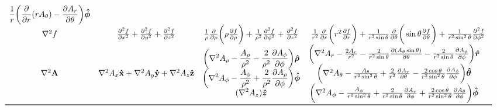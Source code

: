 \documentclass[a4paper]{article}
\begin{document}
\begin{sidewaystable}
\[\begin{array}{cccc}
\begin{matrix}
    \displaystyle{1 \over r}\bigg ({\partial \over \partial r} ( r A_\theta )
    - {\partial A_r \over \partial \theta} \bigg) \boldsymbol{\hat \phi}
\end{matrix}
\\
\nabla^2 f &
{\partial^2 f \over \partial x^2} + {\partial^2 f \over \partial y^2} + {\partial^2 f \over \partial z^2}
&{1 \over \rho}{\partial \over \partial \rho} \bigg (\rho {\partial f \over \partial \rho} \bigg )
+ {1 \over \rho^2}{\partial^2 f \over \partial \phi^2}
+ {\partial^2 f \over \partial z^2}
&{1 \over r^2}{\partial \over \partial r} \bigg (r^2 {\partial f \over \partial r} \bigg)
+ {1 \over r^2\sin\theta}{\partial \over \partial \theta} \bigg(\sin\theta {\partial f \over \partial \theta} \bigg)
+ {1 \over r^2\sin^2\theta}{\partial^2 f \over \partial \phi^2}\\
\nabla^2 \mathbf{A} & \nabla^2 A_x \mathbf{\hat x} + \nabla^2 A_y \mathbf{\hat y} + \nabla^2 A_z \mathbf{\hat z} & 
\begin{matrix}
    \displaystyle \bigg (\nabla^2 A_\rho - {A_\rho \over \rho^2}
    - {2 \over \rho^2}{\partial A_\phi \over \partial \phi} \bigg) \boldsymbol{\hat\rho}\\
    \displaystyle \bigg (\nabla^2 A_\phi - {A_\phi \over \rho^2}
    + {2 \over \rho^2}{\partial A_\rho \over \partial \phi} \bigg ) \boldsymbol{\hat\phi}\\
    \displaystyle (\nabla^2 A_z ) \boldsymbol{\hat z}
\end{matrix} & 
\begin{matrix}
    \bigg (\nabla^2 A_r - {2 A_r \over r^2}
    - {2 \over r^2\sin\theta}{\partial (A_\theta \sin\theta) \over \partial\theta}
    - {2 \over r^2\sin\theta}{\partial A_\phi \over \partial \phi} \bigg ) \boldsymbol{\hat r}\\
    \bigg (\nabla^2 A_\theta - {A_\theta \over r^2\sin^2\theta}
    + {2 \over r^2}{\partial A_r \over \partial \theta}
    - {2 \cos\theta \over r^2\sin^2\theta}{\partial A_\phi \over \partial \phi} \bigg ) \boldsymbol{\hat\theta}\\
    \bigg (\nabla^2 A_\phi - {A_\phi \over r^2\sin^2\theta}
    + {2 \over r^2\sin\theta}{\partial A_r \over \partial \phi}
    + {2 \cos\theta \over r^2\sin^2\theta}{\partial A_\theta \over \partial \phi} \bigg ) \boldsymbol{\hat\phi} & 
\end{matrix}
\\ \bottomrule
\end{array}
\]
\end{sidewaystable}
\end{document}
